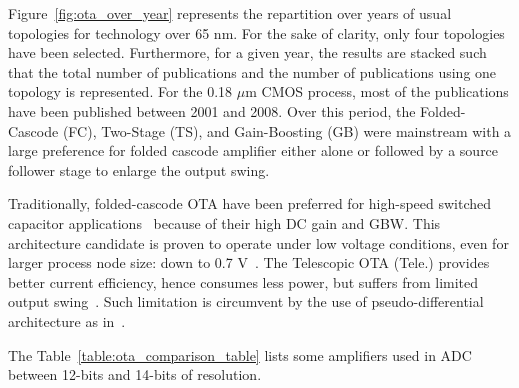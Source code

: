 Figure~\ref{fig:ota_over_year} represents the repartition over years of usual topologies for technology over 65 nm. For the sake of clarity, only four topologies have been selected. Furthermore, for a given year, the results are stacked such that the total number of publications and the number of publications using one topology is represented.
For the 0.18 \(\mu \)m CMOS process, most of the publications have been published between 2001 and 2008. Over this period, the Folded-Cascode (FC), Two-Stage (TS), and Gain-Boosting (GB) were mainstream with a large preference for folded cascode amplifier either alone or followed by a source follower stage to enlarge the output swing.

Traditionally, folded-cascode OTA have been preferred for high-speed switched capacitor applications~\cite{Olivera1999, Adut2003} because of their high DC gain and GBW\@. This architecture candidate is proven to operate under low voltage conditions, even for larger process node size: down to 0.7 V~\cite{Sauerbrey2002, Ahn2005}.
The Telescopic OTA (Tele.) provides better current efficiency, hence consumes less power, but suffers from limited output swing~\cite{Quinn2000}. Such limitation is circumvent by the use of pseudo-differential architecture as in~\cite{Chiu2004}.

The Table~\ref{table:ota_comparison_table} lists some amplifiers used in ADC between 12-bits and 14-bits of resolution. 

